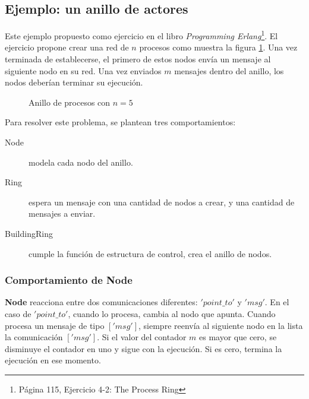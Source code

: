 \subsection{Ejemplo: un anillo de actores}
Este ejemplo propuesto como ejercicio en el libro \textit{Programming Erlang}\cite{Cesarini:2009:EP:1717841}\footnote{Página 115, Ejercicio 4-2: The Process Ring}. El ejercicio propone crear una red de $n$ procesos como muestra la figura \ref{fig:anillo}. Una vez terminada de establecerse, el primero de estos nodos envía un mensaje al siguiente nodo en su red.  Una vez enviados $m$ mensajes dentro del anillo, los nodos deberían terminar su ejecución.

\begin{figure}[H]
\centering
{}
\caption{Anillo de procesos con $n=5$}
\label{fig:anillo}
\end{figure}

Para resolver este problema, se plantean tres comportamientos:

\begin{description}
 \item [Node] modela cada nodo del anillo.
 \item [Ring] espera un mensaje con una cantidad de nodos a crear, y una cantidad de mensajes a enviar.
 \item [BuildingRing] cumple la función de estructura de control, crea el anillo de nodos.
\end{description}

\subsubsection*{Comportamiento de Node}

\textbf{Node} reacciona entre dos comunicaciones diferentes: $'point\_to'$ y $'msg'$. En el caso de $'point\_to'$, cuando lo procesa, cambia al nodo que apunta. Cuando procesa un mensaje de tipo $['msg']$, siempre reenvía al siguiente nodo en la lista la comunicación $['msg']$. Si el valor del contador $m$ es mayor que cero, se disminuye el contador en uno y sigue con la ejecución. Si es cero, termina la ejecución en ese momento.


